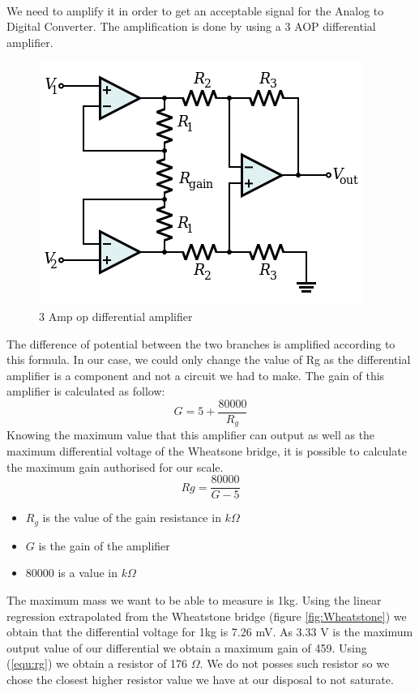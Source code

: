 \documentclass{article}[12pt]
\begin{document}
\paragraph{}
We need to amplify it in order to get an acceptable signal for the Analog to Digital Converter.
The amplification is done by using a 3 AOP differential amplifier.
\begin{figure}[H]
    \centering
    \includegraphics[width = .4\textwidth]{figures/3AOP_differential_amplifier.png}
    \caption{3 Amp op differential amplifier}
    \label{fig:3OpAmp}
\end{figure}
The difference of potential between the two branches is amplified according to this formula.
In our case, we could only change the value of Rg as the differential amplifier is a component and not a circuit we had to make. The gain of this amplifier is calculated as follow:
\begin{equation}
    G=5+\dfrac{80000}{R_g}
\end{equation}
Knowing the maximum value that this amplifier can output as well as the maximum differential voltage of the Wheatsone bridge, it is possible to calculate the maximum gain authorised for our scale.
\begin{equation}
    Rg= \dfrac{80000}{G-5}
    \label{equ:rg}
\end{equation}
\begin{itemize}
    \item $R_g$ is the value of the gain resistance in $k\Omega$
    \item $G$ is the gain of the amplifier
    \item $80000$ is a value in $k\Omega$
\end{itemize}
The maximum mass we want to be able to measure is 1kg.
Using the linear regression extrapolated from the Wheatstone bridge (figure \ref{fig:Wheatstone}) we obtain that the differential voltage for 1kg is 7.26 mV.
As 3.33 V is the maximum output value of our differential we obtain a maximum gain of 459.
Using (\ref{equ:rg}) we obtain a resistor of 176 $\Omega$. We do not posses such resistor so we chose the closest higher resistor value we have at our disposal to not saturate.
\end{document}
